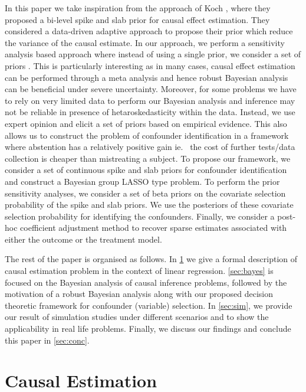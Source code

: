 \documentclass[oribibl]{llncs}
\begin{document}
In this paper we take inspiration from the approach of Koch \cite{koch2020}, where
they proposed a bi-level spike and slab prior for causal effect 
estimation. They considered a data-driven adaptive approach to
propose their prior which reduce the variance of the causal estimate. 
In our approach, we perform a 
sensitivity analysis based approach where instead of using a single prior, 
we consider a set of priors \cite{BERGER1990303}. This is particularly 
interesting as in many cases, causal effect estimation can be performed 
through a meta analysis and hence robust Bayesian analysis \cite{raices_cruz22} 
can be beneficial under severe uncertainty. Moreover, for some problems 
we have to rely on very limited data to perform our Bayesian analysis and 
inference may not be reliable in presence of hetaroskedasticity within
the data. Instead, we use expert opinion and elicit a set of priors 
based on empirical evidence. 
This also allows us to construct the problem of confounder identification 
in a framework where abstention has a relatively positive gain ie.~
the cost of further tests/data collection is cheaper than
mistreating a subject. To propose our 
framework, we consider a set of continuous spike and slab priors 
\cite{ishwaran2005} for confounder identification and construct a Bayesian 
group LASSO \cite{xu2015} type problem. To perform the prior sensitivity 
analyses, we consider a set of beta priors on the covariate selection 
probability of the spike and slab priors. We use the posteriors of these
covariate selection probability for identifying the confounders. Finally, 
we consider a post-hoc coefficient adjustment method \cite{hahn2015}
to recover sparse estimates associated with either the outcome or the
treatment model. 

The rest of the paper is organised as follows. In \cref{sec:causal}
we give a formal description of causal estimation problem in the
context of linear regression. \cref{sec:bayes} is focused on the
Bayesian analysis of causal inference problems, followed by the
motivation of a robust Bayesian analysis along with our proposed decision 
theoretic framework for confounder (variable) selection. In \cref{sec:sim}, 
we provide our result of simulation studies under different scenarios 
and to show the applicability in real life problems. Finally, 
we discuss our findings and conclude this paper in \cref{sec:conc}.

\section{Causal Estimation}\label{sec:causal}
\end{document}
